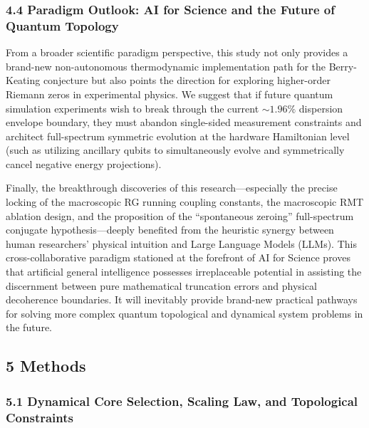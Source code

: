 \hypertarget{paradigm-outlook-ai-for-science-and-the-future-of-quantum-topology}{%
\subsubsection{\texorpdfstring{\textbf{4.4 Paradigm Outlook: AI for
Science and the Future of Quantum
Topology}}{4.4 Paradigm Outlook: AI for Science and the Future of Quantum Topology}}\label{paradigm-outlook-ai-for-science-and-the-future-of-quantum-topology}}

From a broader scientific paradigm perspective, this study not only
provides a brand-new non-autonomous thermodynamic implementation path
for the Berry-Keating conjecture but also points the direction for
exploring higher-order Riemann zeros in experimental physics. We suggest
that if future quantum simulation experiments wish to break through the
current \(\text{∼1.96\%}\) dispersion envelope boundary, they must
abandon single-sided measurement constraints and architect full-spectrum
symmetric evolution at the hardware Hamiltonian level (such as utilizing
ancillary qubits to simultaneously evolve and symmetrically cancel
negative energy projections).

Finally, the breakthrough discoveries of this research---especially the
precise locking of the macroscopic RG running coupling constants, the
macroscopic RMT ablation design, and the proposition of the
``spontaneous zeroing'' full-spectrum conjugate hypothesis---deeply
benefited from the heuristic synergy between human researchers' physical
intuition and Large Language Models (LLMs). This cross-collaborative
paradigm stationed at the forefront of AI for Science proves that
artificial general intelligence possesses irreplaceable potential in
assisting the discernment between pure mathematical truncation errors
and physical decoherence boundaries. It will inevitably provide
brand-new practical pathways for solving more complex quantum
topological and dynamical system problems in the future.

\hypertarget{methods}{%
\subsection{\texorpdfstring{\textbf{5
Methods}}{5 Methods}}\label{methods}}

\hypertarget{dynamical-core-selection-scaling-law-and-topological-constraints}{%
\subsubsection{\texorpdfstring{\textbf{5.1 Dynamical Core Selection,
Scaling Law, and Topological
Constraints}}{5.1 Dynamical Core Selection, Scaling Law, and Topological Constraints}}\label{dynamical-core-selection-scaling-law-and-topological-constraints}}


